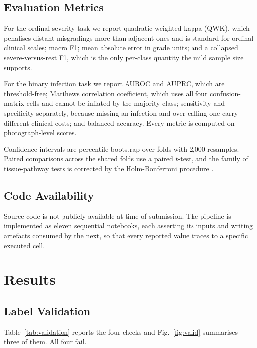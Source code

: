 \subsection{Evaluation Metrics}

For the ordinal severity task we report quadratic weighted kappa (QWK),
which penalises distant misgradings more than adjacent ones and is standard
for ordinal clinical scales; macro F1; mean absolute error in grade units;
and a collapsed severe-versus-rest F1, which is the only per-class quantity
the mild sample size supports.

For the binary infection task we report AUROC and AUPRC, which are
threshold-free; Matthews correlation coefficient, which uses all four
confusion-matrix cells and cannot be inflated by the majority class;
sensitivity and specificity separately, because missing an infection and
over-calling one carry different clinical costs; and balanced accuracy.
Every metric is computed on photograph-level scores.

Confidence intervals are percentile bootstrap over folds with 2{,}000
resamples. Paired comparisons across the shared folds use a paired
$t$-test, and the family of tissue-pathway tests is corrected by the
Holm-Bonferroni procedure \cite{holm1979}.

\subsection{Code Availability}

Source code is not publicly available at time of submission. The pipeline
is implemented as eleven sequential notebooks, each asserting its inputs
and writing artefacts consumed by the next, so that every reported value
traces to a specific executed cell.

\section{Results}

\subsection{Label Validation}

Table~\ref{tab:validation} reports the four checks and Fig.~\ref{fig:valid}
summarises three of them. All four fail.

